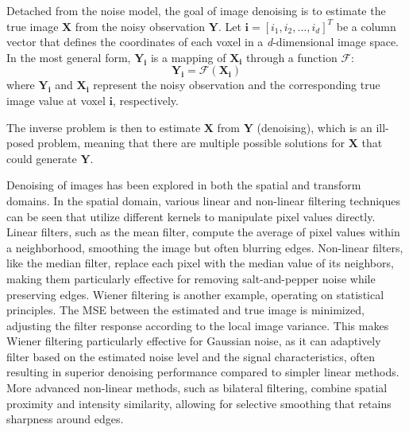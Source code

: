 Detached from the noise model, the goal of image denoising is to estimate the true image $\mathbf{X}$ from the noisy observation $\mathbf{Y}$. Let $\mathbf{i} = [i_1, i_2, \dots, i_d]^T$ be a column vector that defines the coordinates of each voxel in a \textit{d}-dimensional image space. In the most general form, $\mathbf{Y_{\mathbf{i}}}$ is a mapping of $\mathbf{X_{\mathbf{i}}}$ through a function $\mathcal{F}$:
\begin{equation*}
    \mathbf{Y_{\mathbf{i}}} = \mathcal{F} (\mathbf{X_{\mathbf{i}}})
\end{equation*}
where $\mathbf{Y_{\mathbf{i}}}$ and $\mathbf{X_{\mathbf{i}}}$ represent the noisy observation and the corresponding true image value at voxel $\mathbf{i}$, respectively.

The inverse problem is then to estimate $\mathbf{X}$ from $\mathbf{Y}$ (denoising), which is an ill-posed problem, meaning that there are multiple possible solutions for $\mathbf{X}$ that could generate $\mathbf{Y}$.

Denoising of images has been explored in both the spatial and transform domains. In the spatial domain, various linear and non-linear filtering techniques can be seen that utilize different kernels to manipulate pixel values directly. Linear filters, such as the mean filter, compute the average of pixel values within a neighborhood, smoothing the image but often blurring edges. Non-linear filters, like the median filter, replace each pixel with the median value of its neighbors, making them particularly effective for removing salt-and-pepper noise while preserving edges. Wiener filtering is another example, operating on statistical principles. The \gls{MSE} between the estimated and true image is minimized, adjusting the filter response according to the local image variance. This makes Wiener filtering particularly effective for Gaussian noise, as it can adaptively filter based on the estimated noise level and the signal characteristics, often resulting in superior denoising performance compared to simpler linear methods. More advanced non-linear methods, such as bilateral filtering, combine spatial proximity and intensity similarity, allowing for selective smoothing that retains sharpness around edges.

